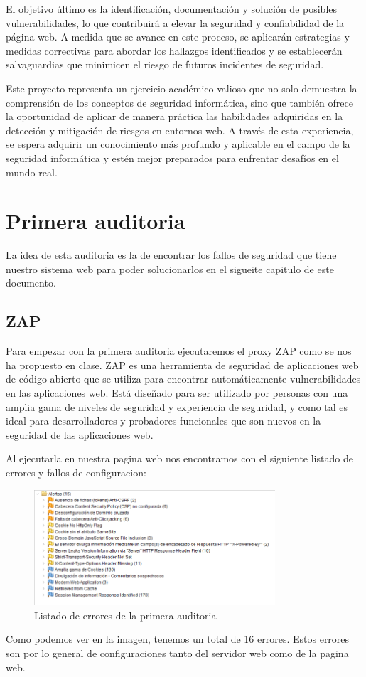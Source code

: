 \documentclass{report}
\begin{document}
        El objetivo último es la identificación, documentación y solución de posibles vulnerabilidades, lo que contribuirá a elevar la seguridad y confiabilidad de la página web. A medida que se avance en este proceso, se aplicarán estrategias y medidas correctivas para abordar los hallazgos identificados y se establecerán salvaguardias que minimicen el riesgo de futuros incidentes de seguridad.
        
        Este proyecto representa un ejercicio académico valioso que no solo demuestra la comprensión de los conceptos de seguridad informática, sino que también ofrece la oportunidad de aplicar de manera práctica las habilidades adquiridas en la detección y mitigación de riesgos en entornos web. A través de esta experiencia, se espera adquirir un conocimiento más profundo y aplicable en el campo de la seguridad informática y estén mejor preparados para enfrentar desafíos en el mundo real.
    \chapter{Primera auditoria}
        La idea de esta auditoria es la de encontrar los fallos de seguridad que tiene nuestro sistema web para poder solucionarlos en el sigueite capitulo de este documento.
        \section{ZAP}
            Para empezar con la primera auditoria ejecutaremos el proxy ZAP como se nos ha propuesto en clase.
            ZAP es una herramienta de seguridad de aplicaciones web de código abierto que se utiliza para encontrar automáticamente vulnerabilidades en las aplicaciones web. Está diseñado para ser utilizado por personas con una amplia gama de niveles de seguridad y experiencia de seguridad, y como tal es ideal para desarrolladores y probadores funcionales que son nuevos en la seguridad de las aplicaciones web.
            
            Al ejecutarla en nuestra pagina web nos encontramos con el siguiente listado de errores y fallos de configuracion:
            \begin{figure}[H]
                \centering
                \includegraphics[width=0.8\textwidth]{./img/audit1/zap1.png}
                \caption{Listado de errores de la primera auditoria}
            \end{figure}
            Como podemos ver en la imagen, tenemos un total de 16 errores.
            Estos errores son por lo general de configuraciones tanto del servidor web como de la pagina web.
\end{document}
